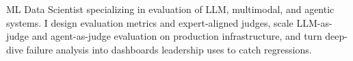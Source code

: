 \small{ML Data Scientist specializing in evaluation of LLM, multimodal, and agentic systems. I design evaluation metrics and expert-aligned judges, scale LLM-as-judge and agent-as-judge evaluation on production infrastructure, and turn deep-dive failure analysis into dashboards leadership uses to catch regressions.}
